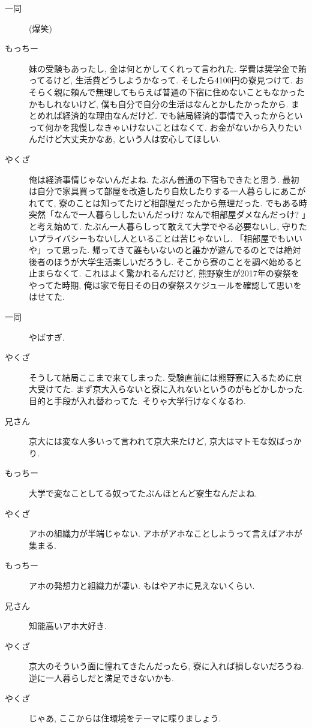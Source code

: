 \documentclass[10pt,b5jsbook,dvips,dvipdfmx,openany]{jsbook}
\theoremstyle{definition}
\begin{document}
\begin{description}
		\item[ 一同 ](爆笑)
		\item[もっちー]妹の受験もあったし, 金は何とかしてくれって言われた. 学費は奨学金で賄ってるけど, 生活費どうしようかなって. そしたら4100円の寮見つけて. おそらく親に頼んで無理してもらえば普通の下宿に住めないこともなかったかもしれないけど, 僕も自分で自分の生活はなんとかしたかったから. まとめれば経済的な理由なんだけど. でも結局経済的事情で入ったからといって何かを我慢しなきゃいけないことはなくて. お金がないから入りたいんだけど大丈夫かなあ, という人は安心してほしい.
		\item[やくざ]俺は経済事情じゃないんだよね. たぶん普通の下宿もできたと思う. 最初は自分で家具買って部屋を改造したり自炊したりする一人暮らしにあこがれてて, 寮のことは知ってたけど相部屋だったから無理だった. でもある時突然「なんで一人暮らししたいんだっけ? なんで相部屋ダメなんだっけ? 」と考え始めて. たぶん一人暮らしって敢えて大学でやる必要ないし, 守りたいプライバシーもないし人といることは苦じゃないし. 「相部屋でもいいや」って思った. 帰ってきて誰もいないのと誰かが遊んでるのとでは絶対後者のほうが大学生活楽しいだろうし. そこから寮のことを調べ始めると止まらなくて. これはよく驚かれるんだけど, 熊野寮生が2017年の寮祭をやってた時期, 俺は家で毎日その日の寮祭スケジュールを確認して思いをはせてた.
		\item[ 一同 ]やばすぎ.
		\item[やくざ]そうして結局ここまで来てしまった. 受験直前には熊野寮に入るために京大受けてた. まず京大入らないと寮に入れないというのがもどかしかった. 目的と手段が入れ替わってた. そりゃ大学行けなくなるわ.
		\item[兄さん]京大には変な人多いって言われて京大来たけど, 京大はマトモな奴ばっかり.
		\item[もっちー]大学で変なことしてる奴ってたぶんほとんど寮生なんだよね.
		\item[やくざ]アホの組織力が半端じゃない. アホがアホなことしようって言えばアホが集まる.
		\item[もっちー]アホの発想力と組織力が凄い. もはやアホに見えないくらい.
		\item[兄さん]知能高いアホ大好き.
		\item[やくざ]京大のそういう面に憧れてきたんだったら, 寮に入れば損しないだろうね. 逆に一人暮らしだと満足できないかも.
		\item[やくざ]じゃあ, ここからは住環境をテーマに喋りましょう.
		\end{description}
\end{document}
